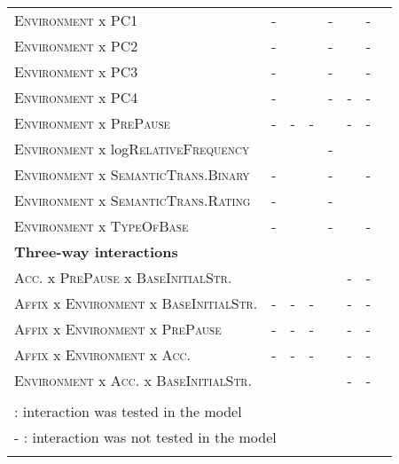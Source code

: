 \begin{table}
{\begin{tabular}{llrrrrrr}
	\textsc{Environment} x \textsc{PC1}  &- &\checkmark&\checkmark&-&\checkmark&-\\
	\textsc{Environment} x \textsc{PC2}  & -&\checkmark&\checkmark&-&\checkmark&-\\
	\textsc{Environment} x \textsc{PC3}  & -&\checkmark&\checkmark&-&\checkmark&-\\
	\textsc{Environment} x \textsc{PC4}  & -&\checkmark&\checkmark&-&-&-\\
	
		\textsc{Environment} x \textsc{PrePause}  & -&-&-&\checkmark&-&-\\
		
	
	\textsc{Environment} x log\textsc{RelativeFrequency}  & \checkmark&\checkmark&\checkmark&-&\checkmark&\checkmark\\
	\textsc{Environment} x \textsc{SemanticTrans.Binary}  & -&\checkmark&\checkmark&-&\checkmark&-\\
	\textsc{Environment} x \textsc{SemanticTrans.Rating}  &- &\checkmark&\checkmark&-&\checkmark&\checkmark\\
	\textsc{Environment} x \textsc{TypeOfBase}  & -&\checkmark&\checkmark&-&\checkmark&-\\
	
	\midrule 

		 \textbf{Three-way interactions} & &&&& &\\
		 \midrule
		 \textsc{Acc.} x \textsc{PrePause} x \textsc{BaseInitialStr.} & \checkmark&\checkmark&\checkmark&\checkmark&-&-\\
		 \textsc{Affix} x \textsc{Environment} x \textsc{BaseInitialStr.} & -&-&-&\checkmark&- &-\\
		 \textsc{Affix} x \textsc{Environment} x \textsc{PrePause} & -&-&-&\checkmark&- &-\\
		 \textsc{Affix} x \textsc{Environment} x \textsc{Acc.} & -&-&-&\checkmark&- &-\\
		 
		 	\textsc{Environment} x \textsc{Acc.} x \textsc{BaseInitialStr.}  & \checkmark&\checkmark&\checkmark&\checkmark&-&-\\
	 	
		 \midrule
	\\
	\multicolumn{6}{l}{\small \checkmark \hspace*{0.2cm}: interaction was tested in the model} & \\			
	\multicolumn{6}{l}{\small - \hspace*{0.45cm}: interaction was not tested in the model} & \\			
	&
			\end{tabular}
}


\end{table}






